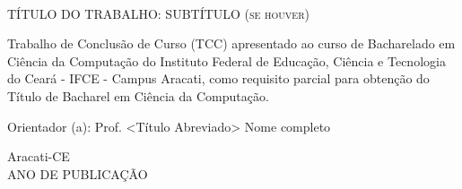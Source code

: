 \vfill
\begin{center}

{\imprimirautor\\}
\vspace{3cm}
{\textsc{TÍTULO DO TRABALHO: SUBTÍTULO (se houver)}\\}
\vspace{5cm}
\hspace{.45\linewidth}
\begin{minipage}{.50\linewidth}
Trabalho de Conclusão de Curso (TCC) apresentado ao curso de Bacharelado em Ciência da Computação do Instituto Federal de Educação, Ciência e Tecnologia do Ceará - IFCE - Campus Aracati, como requisito parcial para obtenção do Título de Bacharel em Ciência da Computação.

\vspace{0.5 cm}

Orientador (a): Prof. <Título Abreviado> Nome completo 

\end{minipage}

\vspace{2cm}
\vfill
{\large Aracati-CE\\ANO DE PUBLICAÇÃO}

\end{center}

